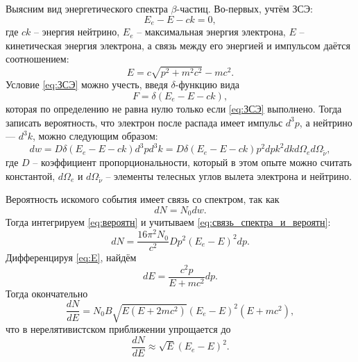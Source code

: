 \documentclass[a4paper]{article}
\newcommand{\btt}{$\beta $}
\newcommand{\dlt}{$\delta $}
\begin{document}
	Выясним вид энергетического спектра \btt-частиц.
	Во-первых, учтём ЗСЭ:
	\begin{equation}\label{eq:ЗСЭ}
		E_e - E - c k = 0,
	\end{equation}
	где $ c k $ -- энергия нейтрино, $ E_e $ -- максимальная энергия электрона, $ E $ -- кинетическая энергия электрона, а связь между его энергией и импульсом даётся соотношением:
	\begin{equation}\label{eq:E}
		E = c \sqrt{p^2+m^2 c^2} - m c^2.
	\end{equation}
	Условие \eqref{eq:ЗСЭ} можно учесть, введя \dlt-функцию вида
	\begin{equation*}\label{key}
		F = \delta(E_e - E - c k),
	\end{equation*}
	которая по определению не равна нулю только если \eqref{eq:ЗСЭ} выполнено.
	Тогда записать вероятность, что электрон после распада имеет импульс $ d^3 p $, а нейтрино --- $ d^3 k $, можно следующим образом:
	\begin{equation}\label{eq:вероятн}
		d w = D \delta(E_e - E - c k) d^3 p d^3 k = D \delta(E_e - E - c k) p^2 d p k^2 d k d \Omega_e d \Omega_{\widetilde{\nu}},
	\end{equation}
	где $ D $ -- коэффициент пропорциональности, который в этом опыте можно считать константой, $ d \Omega_e $ и $ d \Omega_{\widetilde{\nu}} $ -- элементы телесных углов вылета электрона и нейтрино.
	
	Вероятность искомого события имеет связь со спектром, так как
	\begin{equation}\label{eq:связь_спектра_и_вероятн}
		d N = N_0 d w.
	\end{equation}
	Тогда интегрируем \eqref{eq:вероятн} и учитываем \eqref{eq:связь_спектра_и_вероятн}:
	\begin{equation*}\label{eq:dN}
		d N = \dfrac{16 \pi^2 N_0}{c^2} D p^2 \left(E_e - E\right)^2 d p.
	\end{equation*}
	Дифференцируя \eqref{eq:E}, найдём
	\begin{equation*}\label{key}
		d E = \dfrac{c^2 p}{E+m c^2}d p.
	\end{equation*}
	Тогда окончательно
	\begin{equation}\label{eq:spectre}
		\dfrac{d N}{d E} = N_0 B \sqrt{E\left(E+2 m c^2\right)}\left(E_e-E\right)^2\left(E+m c^2\right), 
	\end{equation}
	что в нерелятивистском приближении упрощается до 
	\begin{equation}\label{eq:simpleSpectre}
		\dfrac{d N}{d E} \approx \sqrt{E} \left(E_e - E\right)^2.
	\end{equation}
	
\end{document}
